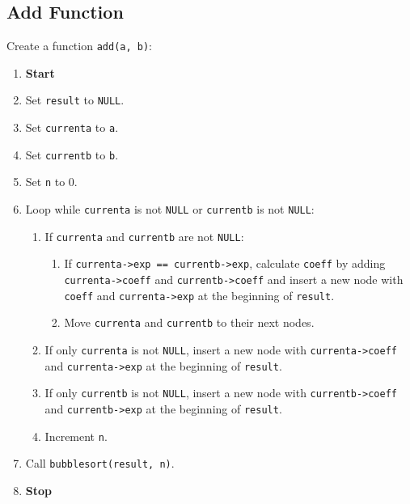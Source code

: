 {  \subsection{Add Function}
  Create a function \texttt{add(a, b)}:
  \begin{enumerate}[label=\arabic*:,left=0pt]
    \item \textbf{Start}
    \item Set \texttt{result} to \texttt{NULL}.
    \item Set \texttt{currenta} to \texttt{a}.
    \item Set \texttt{currentb} to \texttt{b}.
    \item Set \texttt{n} to 0.
    \item Loop while \texttt{currenta} is not \texttt{NULL} or \texttt{currentb} is not \texttt{NULL}:
          \begin{enumerate}[label=2.\arabic*:, start=1]
            \item If \texttt{currenta} and \texttt{currentb} are not \texttt{NULL}:
                  \begin{enumerate}[label=2.2.\arabic*:, start=1]
                    \item If \texttt{currenta->exp == currentb->exp}, calculate \texttt{coeff} by adding \texttt{currenta->coeff} and \newline \texttt{currentb->coeff} and insert a new node with \texttt{coeff} and \texttt{currenta->exp} at the \newline beginning of \texttt{result}.
                    \item Move \texttt{currenta} and \texttt{currentb} to their next nodes.
                  \end{enumerate}
            \item If only \texttt{currenta} is not \texttt{NULL}, insert a new node with \texttt{currenta->coeff} and \texttt{currenta->exp} \newline at the beginning of \texttt{result}.
            \item If only \texttt{currentb} is not \texttt{NULL}, insert a new node with \texttt{currentb->coeff} and \texttt{currentb->exp} \newline at the beginning of \texttt{result}.
            \item Increment \texttt{n}.
          \end{enumerate}
    \item Call \texttt{bubblesort(result, n)}.
    \item \textbf{Stop}
  \end{enumerate}

}
